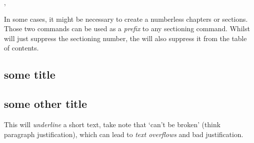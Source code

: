 \documentclass[article,nogeometry,english,tocdepth=3,secdepth=3]{ufrgscca} %
\begin{document}
\begin{codedescribe}{\nonum,\notoc}
	\begin{codesyntax}%
	\end{codesyntax}
In some cases, it might be necessary to create a numberless chapters or sections. Those two commands can be used as a \emph{prefix} to any sectioning command. Whilst \tsmacro{\nonum}{} will just suppress the sectioning number, the \tsmacro{\notoc}{} will also suppress it from the table of contents.
\end{codedescribe}

\begin{codestore}[st=demononum]
	\nonum\chapter{some title} %
	\notoc\section{some other title} %
\end{codestore}

\begin{codedescribe}{\tightul}
	\begin{codesyntax}%
		\tsmacro{\tightul}{text}
	\end{codesyntax}
This will \emph{underline} a short text, take note that  `can't be broken' (think paragraph justification), which can lead to \emph{text overflows} and bad justification.
\end{codedescribe}
\end{document}
